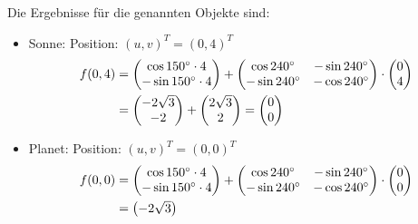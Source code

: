 \documentclass[a4paper,10pt,DIV=14]{scrartcl}
\begin{document}
Die Ergebnisse für die genannten Objekte sind:
\begin{itemize}
\item Sonne: Position: $(u,v)^T = (0,4)^T$ 
\begin{align*}
f(0,4) &=
\begin{pmatrix}
\cos 150\degree \cdot 4 \\
-\sin 150\degree \cdot 4 \\
\end{pmatrix}
+ 
\begin{pmatrix}
\cos 240\degree & -\sin 240\degree \\
-\sin 240\degree & -\cos 240\degree \\
\end{pmatrix}
\cdot
\begin{pmatrix}
0 \\
4 \\
\end{pmatrix}
\\
&=
\begin{pmatrix}
-2\sqrt{3} \\
-2
\end{pmatrix}
+ 
\begin{pmatrix}
2\sqrt{3} \\
2  \\
\end{pmatrix}
= \begin{pmatrix}
0 \\
0
\end{pmatrix}
\end{align*}
\item Planet: Position: $(u,v)^T = (0,0)^T$ 
\begin{align*}
f(0,0) &=
\begin{pmatrix}
\cos 150\degree \cdot 4 \\
-\sin 150\degree \cdot 4 \\
\end{pmatrix}
+ 
\begin{pmatrix}
\cos 240\degree & -\sin 240\degree \\
-\sin 240\degree & -\cos 240\degree \\
\end{pmatrix}
\cdot
\begin{pmatrix}
0 \\
0 \\
\end{pmatrix}
\\
&=
\begin{pmatrix}
-2\sqrt{3} \\

\end{pmatrix}
\end{align*}
\end{itemize}
\end{document}
